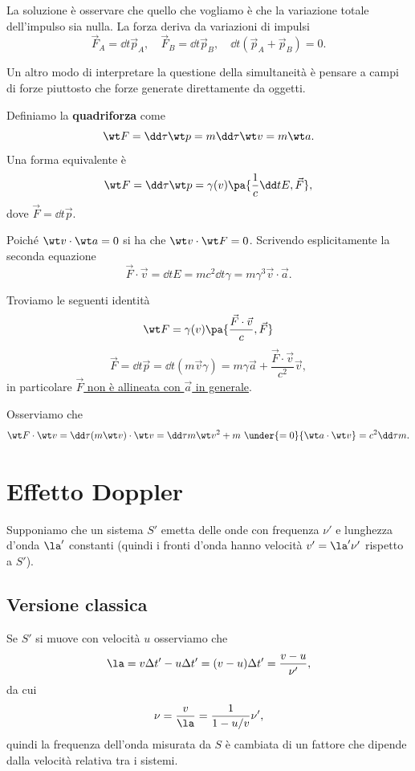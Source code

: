 \noindent La soluzione \`e osservare che quello che vogliamo \`e che la variazione totale dell'impulso sia nulla. La forza deriva da variazioni di impulsi
\[\vec F_A=\dd t{\vec p_A},\quad \vec F_B=\dd t{\vec p_B},\quad \dd t{}(\vec p_A+\vec p_B)=0.\]
\bigskip

\noindent Un altro modo di interpretare la questione della simultaneit\`a \`e pensare a campi di forze piuttosto che forze generate direttamente da oggetti.

\begin{definition}[Quadriforza]
Definiamo la \textbf{quadriforza} come
\[\wt F=\dd \tau{\wt p}=m\dd\tau{\wt v}=m\wt a.\]
Una forma equivalente \`e 
\[\wt F=\dd \tau{\wt p}=\gamma(v)\pa{\frac1c\dd tE,\vec F},\]
dove $\vec F=\dd t{\vec p}$.
\end{definition}

\begin{remark}
Poich\'e $\wt v\cdot \wt a=0$ si ha che $\wt v\cdot\wt F=0$. Scrivendo esplicitamente la seconda equazione
\[\vec F\cdot \vec v=\dd tE=mc^2\dd t\gamma=m\gamma^3 \vec v\cdot \vec a.\]
\end{remark}

\begin{remark}
Troviamo le seguenti identit\`a
\[\wt F=\gamma(v)\pa{\frac{\vec F\cdot \vec v}c,\vec F}\]
\[\vec F=\dd t{\vec p}=\dd t{}(m\vec v\gamma)=m\gamma\vec a+\frac{\vec F\cdot \vec v}{c^2}\vec v,\]
in particolare \underline{$\vec F$ non \`e allineata con $\vec a$ in generale}.
\end{remark}

\begin{remark}
Osserviamo che
\[\wt F\cdot \wt v=\dd\tau{}(m\wt v)\cdot \wt v=\dd\tau m\wt v^2+m\ \under{=0}{\wt a\cdot \wt v}=c^2\dd\tau m.\]
\end{remark}

\section{Effetto Doppler}
Supponiamo che un sistema $S'$ emetta delle onde con frequenza $\nu'$ e lunghezza d'onda $\la'$ constanti (quindi i fronti d'onda hanno velocit\`a $v'=\la'\nu'$ rispetto a $S'$).

\subsection{Versione classica}
Se $S'$ si muove con velocit\`a $u$ osserviamo che
\[\la=v\Delta t'-u\Delta t'=(v-u)\Delta t'=\frac{v-u}{\nu'},\]
da cui
\[\nu=\frac v\la=\frac1{1-u/v}\nu',\]
quindi la frequenza dell'onda misurata da $S$ \`e cambiata di un fattore che dipende dalla velocit\`a relativa tra i sistemi.\medskip

